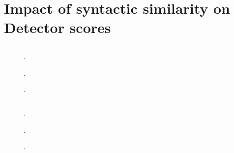 \section{Impact of syntactic similarity on \imp{} Detector scores}
\label{sec:syn_sim_impact}

\subsection{\dataStudent{}}
\begin{figure}[htbp]
    \centering
    
    \caption{.}
    \label{fig:impact_syn_student_diff}
\end{figure}

\begin{figure}[htbp]
    \centering
    
    \caption{.}
    \label{fig:impact_syn_student_disp_cand}
\end{figure}

\begin{figure}[htbp]
    \centering
    
    \caption{.}
    \label{fig:impact_syn_student_ref_paraph}
\end{figure}

\subsection{\dataBlog{}}
\begin{figure}[htbp]
    \centering
    
    \caption{.}
    \label{fig:impact_syn_student_diff_acc}
\end{figure}

\begin{figure}[htbp]
    \centering
    
    \caption{.}
    \label{fig:impact_syn_student_diff_prec}
\end{figure}

\begin{figure}[htbp]
    \centering
    
    \caption{.}
    \label{fig:impact_syn_student_diff_f1}
\end{figure}